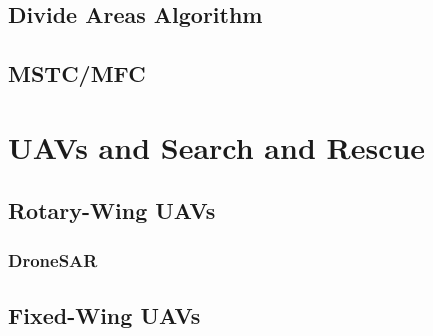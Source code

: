 \subsection{Divide Areas Algorithm}
\subsection{MSTC/MFC}

\section{UAVs and Search and Rescue}
\subsection{Rotary-Wing UAVs}
\subsubsection{DroneSAR}
\subsection{Fixed-Wing UAVs}


